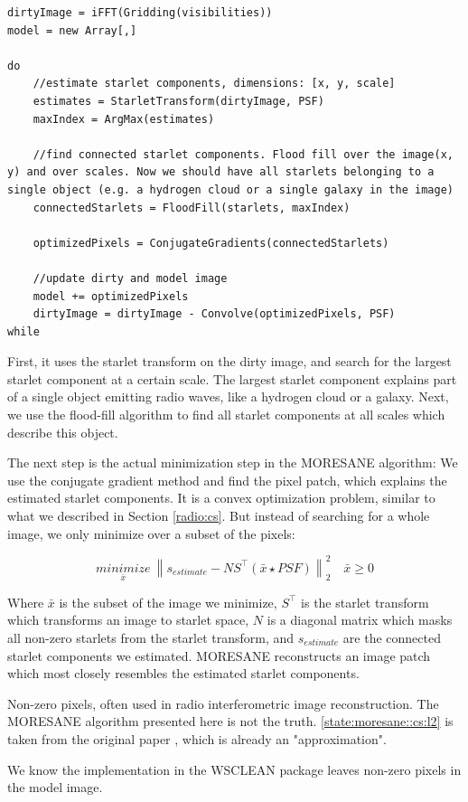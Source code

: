 \begin{lstlisting}
dirtyImage = iFFT(Gridding(visibilities))
model = new Array[,]

do
	//estimate starlet components, dimensions: [x, y, scale]
	estimates = StarletTransform(dirtyImage, PSF)
	maxIndex = ArgMax(estimates)
	
	//find connected starlet components. Flood fill over the image(x, y) and over scales. Now we should have all starlets belonging to a single object (e.g. a hydrogen cloud or a single galaxy in the image)
	connectedStarlets = FloodFill(starlets, maxIndex)
	
	optimizedPixels = ConjugateGradients(connectedStarlets)
	
	//update dirty and model image
	model += optimizedPixels
	dirtyImage = dirtyImage - Convolve(optimizedPixels, PSF)
while
\end{lstlisting}

First, it uses the starlet transform on the dirty image, and search for the largest starlet component at a certain scale. The largest starlet component explains part of a single object emitting radio waves, like a hydrogen cloud or a galaxy. Next, we use the flood-fill algorithm to find all starlet components at all scales which describe this object.

The next step is the actual minimization step in the MORESANE algorithm: We use the conjugate gradient method and find the pixel patch, which explains the estimated starlet components. It is a convex optimization problem, similar to what we described in Section \ref{radio:cs}. But instead of searching for a whole image, we only minimize over a subset of the pixels:

\begin{equation}\label{state:moresane::cs:l2}
\underset{\bar{x}}{minimize} \: \left \| s_{estimate} - NS^\intercal(\bar{x} \star PSF) \right \|_2^2 \quad \bar{x} \geq 0
\end{equation}

Where $\bar{x}$ is the subset of the image we minimize, $S^\intercal$ is the starlet transform which transforms an image to starlet space, $N$ is a diagonal matrix which masks all non-zero starlets from the starlet transform, and $s_{estimate}$ are the connected starlet components we estimated. MORESANE reconstructs an image patch which most closely resembles the estimated starlet components.

Non-zero pixels, often used in radio interferometric image reconstruction. The MORESANE algorithm presented here is not the truth. \eqref{state:moresane::cs:l2} is taken from the original paper \cite{dabbech2015moresane}, which is already an "approximation". 

We know the implementation in the WSCLEAN package leaves non-zero pixels in the model image.





